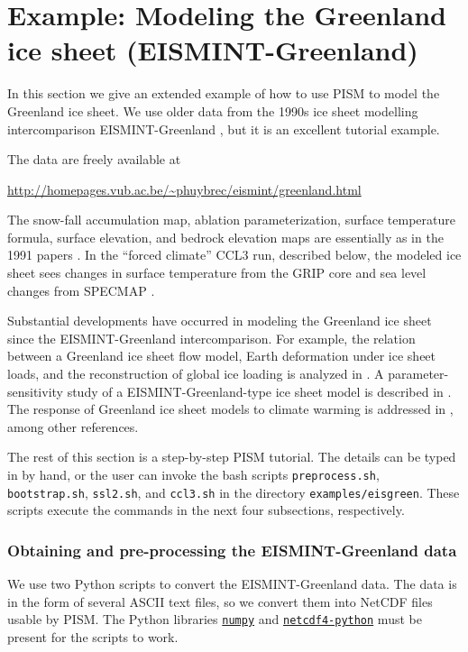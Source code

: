 
\section{Example: Modeling the Greenland ice sheet (EISMINT-Greenland)}\label{sec:eismint-greenland}  

In this section we give an extended example of how to use PISM to model the Greenland ice sheet.  We use older data from the 1990s ice sheet modelling intercomparison EISMINT-Greenland \cite{HuybrechtsEISMINT,RitzEISMINT}, but it is an excellent tutorial example.

The data are freely available at

\begin{center}
  \url{http://homepages.vub.ac.be/~phuybrec/eismint/greenland.html}
\end{center}

\noindent The snow-fall accumulation map, ablation parameterization, surface temperature formula, surface elevation, and bedrock elevation maps are essentially as in the 1991 papers \cite{Letreguillyetal1991,OhmuraReeh}.  In the ``forced climate'' CCL3 run, described below, the modeled ice sheet sees changes in surface temperature from the GRIP core \cite{Dansgaardetal1993} and sea level changes from SPECMAP \cite{Imbrieetal1984}.

Substantial developments have occurred in modeling the Greenland ice sheet since the EISMINT-Greenland intercomparison.  For example, the relation between a Greenland ice sheet flow model, Earth deformation under ice sheet loads, and the reconstruction of global ice loading is analyzed in \cite{TarasovPeltier}.  A parameter-sensitivity study of a EISMINT-Greenland-type ice sheet model is described in \cite{RitzFabreLetreguilly}.  The response of Greenland ice sheet models to climate warming is addressed in \cite{HuybrechtsdeWolde,Huybrechts02, Greve00}, among other references.

The rest of this section is a step-by-step PISM tutorial.  The details can be typed in by hand, or the user can invoke the bash scripts \texttt{preprocess.sh}, \texttt{bootstrap.sh}, \texttt{ssl2.sh}, and \texttt{ccl3.sh} in the directory \texttt{examples/eisgreen}.  These scripts execute the commands in the next four subsections, respectively.

\subsubsection*{Obtaining and pre-processing the EISMINT-Greenland data}  We use two Python scripts to convert the EISMINT-Greenland data.  The data is in the form of several ASCII text files, so we convert them into NetCDF files usable by PISM.  The Python libraries \href{http://numpy.scipy.org/}{\texttt{numpy}} and \href{http://code.google.com/p/netcdf4-python/}{\texttt{netcdf4-python}} must be present for the scripts to work.

